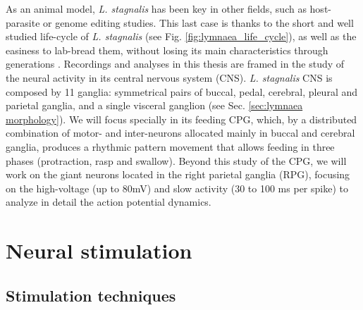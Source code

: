  As an animal model, \textit{L. stagnalis} has been key in other fields, such as host-parasite or genome editing studies. This last case is thanks to the short and well studied life-cycle of  \textit{L. stagnalis} (see Fig. \ref{fig:lymnaea_life_cycle}), as well as the easiness to lab-bread them, without losing its main characteristics through generations \parencite{noland_observations_1946}. Recordings and analyses in this thesis are framed in the study of the neural activity in its central nervous system (CNS). \textit{L. stagnalis} CNS is composed by 11 ganglia: symmetrical pairs of buccal, pedal, cerebral, pleural and parietal ganglia, and a single visceral ganglion (see Sec. \ref{sec:lymnaea morphology}). We will focus specially in its feeding CPG, which, by a distributed combination of motor- and inter-neurons allocated mainly in buccal and cerebral ganglia, produces a rhythmic pattern movement that allows feeding in three phases (protraction, rasp and swallow). Beyond this study of the CPG, we will work on the giant neurons located in the right parietal ganglia (RPG), focusing on the high-voltage (up to 80mV) and slow activity (30 to 100 ms per spike) to analyze in detail the action potential dynamics. 


\section{Neural stimulation}
\subsection{Stimulation techniques}

